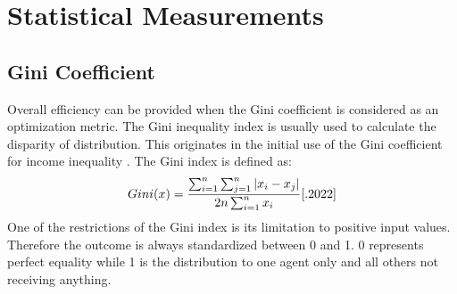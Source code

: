 \documentclass[german, a4paper, 11pt, oneside]{scrbook}
\begin{document}
\section{Statistical Measurements}
\subsection{Gini Coefficient}
Overall efficiency can be provided when the Gini coefficient is considered as an optimization metric. The Gini inequality index is usually used to calculate the disparity of distribution. This originates in the initial use of the Gini coefficient for income inequality \cite{.2022}. 
The Gini index is defined as: 
\[
  Gini(x) = \frac{\sum_{i=1}^n \sum_{j=1}^n | x_i - x_j| }{2 n \sum_{i=1}^n x_i} \cite{.2022}
\]
One of the restrictions of the Gini index is its limitation to positive input values. Therefore the outcome is always standardized between 0 and 1. \cite{ALEXANDERJOHANPHILIPPEEK.2022} 0 represents perfect equality while 1 is the distribution to one agent only and all others not receiving anything.\\
\end{document}
